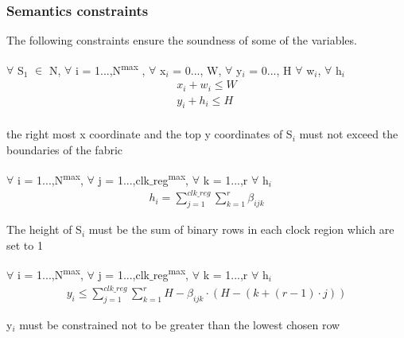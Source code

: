 \hfill \break

\subsubsection{\textbf {Semantics constraints}}
The following constraints ensure the soundness of some of the variables.\\
\begin{constraint} $\forall$ S$_1$ $\in$ N, $\forall$ i = 1...,N\textsuperscript{max} , $\forall$ x$_i$ = 0..., W, $\forall$ y$_i$ = 0..., H $\forall$ w$_i$, $\forall$ h$_i$    
\begin{equation}
\begin{split}
x_i + w_i \leq W \\
y_i + h_i \leq H \\
\end{split}
\end{equation} 
\end{constraint}
\begin{defn} the right most x coordinate and the top y coordinates of S$_i$ must not exceed the boundaries of the fabric \\
\end{defn}

\begin{constraint} $\forall$ i = 1...,N\textsuperscript{max}, $\forall$ j = 1...,clk$\_$reg\textsuperscript{max}, $\forall$ k = 1...,r $\forall$ h$_i$
\begin{equation}
\begin{split}
 h_i = \sum_{j=1}^{clk\_reg} \sum_{k=1}^{r} \beta_{ijk}
\end{split}
\end{equation}
\end{constraint}

\begin{defn}
The height of S$_i$ must be the sum of binary rows in each clock region which are set to 1
\end{defn}

\begin{constraint} $\forall$ i = 1...,N\textsuperscript{max}, $\forall$ j = 1...,clk$\_$reg\textsuperscript{max}, $\forall$ k = 1...,r $\forall$ h$_i$
\begin{equation}
\begin{split}
y_i \leq \sum_{j=1}^{clk\_reg} \sum_{k=1}^{r} H - \beta_{ijk} \cdot (H - (k + (r - 1) \cdot j))
\end{split}
\end{equation}
\end{constraint}
\begin{defn}
y$_i$ must be constrained not to be greater than the lowest chosen row 
\end{defn}


